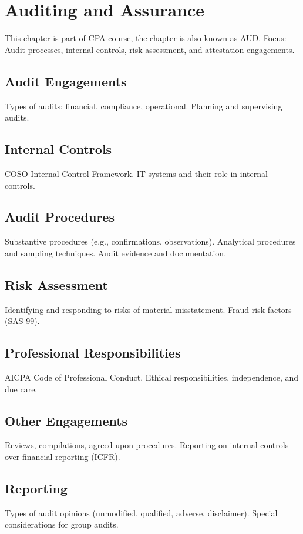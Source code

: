 \chapter{Auditing and Assurance}
This chapter is part of CPA course, the chapter is also known as AUD.
Focus: Audit processes, internal controls, risk assessment, and attestation engagements.

\section{Audit Engagements}
Types of audits: financial, compliance, operational.
Planning and supervising audits.

\section{Internal Controls}
COSO Internal Control Framework.
IT systems and their role in internal controls.

\section{Audit Procedures}
Substantive procedures (e.g., confirmations, observations).
Analytical procedures and sampling techniques.
Audit evidence and documentation.

\section{Risk Assessment}
Identifying and responding to risks of material misstatement.
Fraud risk factors (SAS 99).

\section{Professional Responsibilities}
AICPA Code of Professional Conduct.
Ethical responsibilities, independence, and due care.

\section{Other Engagements}
Reviews, compilations, agreed-upon procedures.
Reporting on internal controls over financial reporting (ICFR).

\section{Reporting}
Types of audit opinions (unmodified, qualified, adverse, disclaimer).
Special considerations for group audits.
